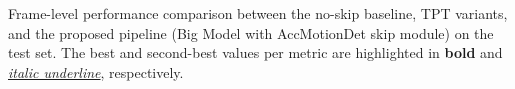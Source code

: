 \begin{table}[htbp]
    \caption{Frame-level performance comparison between the no-skip baseline,
    TPT variants, and the proposed pipeline (Big Model with AccMotionDet skip
    module) on the test set. The best and second-best values per metric are
    highlighted in \textbf{bold} and \underline{\textit{italic underline}},
    respectively.}
    \label{tb:cmp_other_temp}
\end{table}